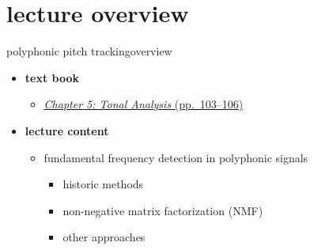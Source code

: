 

\subtitle{Part 6.4: Polyphonic fundamental frequency detection}


	

    \section[overview]{lecture overview}
        \begin{frame}{polyphonic pitch tracking}{overview}
            \begin{itemize}
                \item   \textbf{text book}  
                    \begin{itemize}
                        \item   \href{http://ieeexplore.ieee.org/xpl/articleDetails.jsp?tp=&arnumber=6331122&}{\underline{\textit{Chapter 5: Tonal Analysis} (pp.~103--106)}}
                    \end{itemize}
                \bigskip
                \item<2->   \textbf{lecture content}
                    \begin{itemize}
                        \item<2->   fundamental frequency detection in polyphonic signals
                            \begin{itemize}
                                \item   historic methods
                                \item   non-negative matrix factorization (NMF)
                                \item   other approaches
                            \end{itemize}
                    \end{itemize}
            \end{itemize}
        \end{frame}

